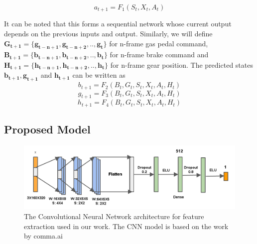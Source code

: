 \documentclass[a4paper,11pt,titlepage,drop]{article}%
\begin{document}
\begin{equation}
					a_{t+1}=F_1(S_t, X_t,A_t)
\end{equation}

It can be noted that this forms a sequential network whose current output depends on the previous inputs and output. Similarly, we will define $\mathbf{G_{t+1}=\{g_{t-n+1}, g_{t-n+2}, . . , g_t\}}$ for n-frame gas pedal command, $\mathbf{B_{t+1}=\{b_{t-n+1}, b_{t-n+2}, . . , b_t\}}$ for n-frame brake command and $\mathbf{H_{t+1}=\{h_{t-n+1}, h_{t-n+2}, . . , h_t\}}$ for n-frame gear position. The predicted states $\mathbf{b_{t+1}, g_{t+1}}$ and $\mathbf{h_{t+1}}$ can be written as \\

\begin{equation}
					b_{t+1}=F_2(B_t, G_t, S_t, X_t, A_t, H_t)
\end{equation}
\begin{equation}
					g_{t+1}=F_3(B_t, G_t, S_t, X_t, A_t, H_t)
\end{equation}
\begin{equation}
					h_{t+1}=F_4(B_t, G_t, S_t, X_t, A_t, H_t)
\end{equation}


\subsection{Proposed Model}

\begin{figure}[hb]
    \center
    \includegraphics[width=\textwidth]{cnn}
    \caption{The Convolutional Neural Network architecture for feature extraction used in our work. The CNN model is based on the work by comma.ai}
    \label{fig:cnn}
\end{figure}
\end{document}
